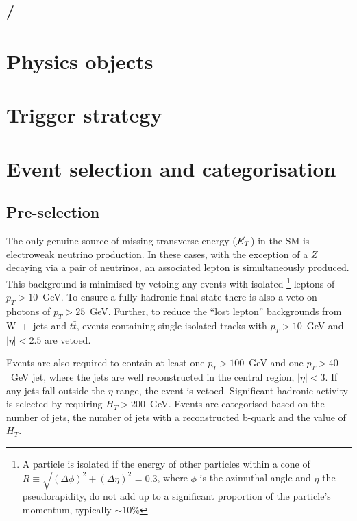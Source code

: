 \subsection{\MHT/\MET}

\section{Physics objects}

\section{Trigger strategy}

\section{Event selection and categorisation}

\subsection{Pre-selection}

The only genuine source of missing transverse energy ($\cancel{E}_T$)
in the SM is electroweak neutrino production. In these cases, with the
exception of a $Z$ decaying via a pair of neutrinos, an associated
lepton is simultaneously produced. This background is minimised by
vetoing any events with isolated \footnote{A particle is isolated if
the energy of other particles within a cone of
$R\equiv\sqrt{(\Delta\phi)^2+(\Delta\eta)^2}=0.3$, where $\phi$ is the
azimuthal angle and $\eta$ the pseudorapidity, do not add up to a
significant proportion of the particle's momentum, typically
$\sim10$\%} leptons of $p_T>10$~GeV. To ensure a fully hadronic final
state there is also a veto on photons of $p_T>25$~GeV. Further, to
reduce the ``lost lepton'' backgrounds from W~+~jets and $t\bar{t}$,
events containing single isolated tracks with $p_T >10$~GeV and
$|\eta| < 2.5$ are vetoed.

Events are also required to contain at least one $p_T>100$~GeV and one
$p_T>40$~GeV jet, where the jets are well reconstructed in the central
region, $|\eta|<3$. If any jets fall outside the $\eta$ range, the
event is vetoed. Significant hadronic activity is selected by
requiring $H_T>200$~GeV. Events are categorised based on the number of
jets, the number of jets with a reconstructed b-quark and the value of
$H_T$. 

